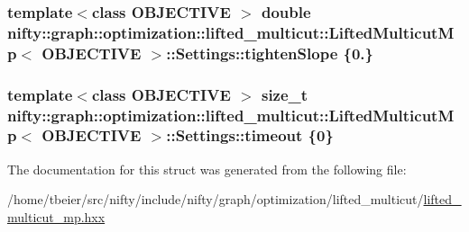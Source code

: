 \subsubsection[{tighten\+Slope}]{\setlength{\rightskip}{0pt plus 5cm}template$<$class O\+B\+J\+E\+C\+T\+I\+V\+E $>$ double {\bf nifty\+::graph\+::optimization\+::lifted\+\_\+multicut\+::\+Lifted\+Multicut\+Mp}$<$ O\+B\+J\+E\+C\+T\+I\+V\+E $>$\+::Settings\+::tighten\+Slope \{0.\}}\label{structnifty_1_1graph_1_1optimization_1_1lifted__multicut_1_1LiftedMulticutMp_1_1Settings_a70f3eb37753c66f16fb541835f75db66}
\hypertarget{structnifty_1_1graph_1_1optimization_1_1lifted__multicut_1_1LiftedMulticutMp_1_1Settings_a83d6f37c140fd9f03e33ec6a1928a0b4}{}
\subsubsection[{timeout}]{\setlength{\rightskip}{0pt plus 5cm}template$<$class O\+B\+J\+E\+C\+T\+I\+V\+E $>$ size\+\_\+t {\bf nifty\+::graph\+::optimization\+::lifted\+\_\+multicut\+::\+Lifted\+Multicut\+Mp}$<$ O\+B\+J\+E\+C\+T\+I\+V\+E $>$\+::Settings\+::timeout \{0\}}\label{structnifty_1_1graph_1_1optimization_1_1lifted__multicut_1_1LiftedMulticutMp_1_1Settings_a83d6f37c140fd9f03e33ec6a1928a0b4}


The documentation for this struct was generated from the following file\+:\begin{DoxyCompactItemize}
\item 
/home/tbeier/src/nifty/include/nifty/graph/optimization/lifted\+\_\+multicut/\hyperlink{lifted__multicut__mp_8hxx}{lifted\+\_\+multicut\+\_\+mp.\+hxx}\end{DoxyCompactItemize}
